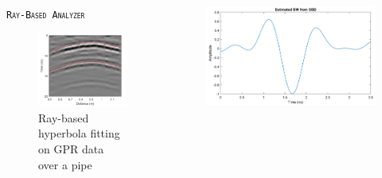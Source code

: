 \documentclass[final]{beamer}
\newlength{\onecolwid}
\newlength{\twocolwid}
\begin{document}
\begin{frame}[t]
\begin{columns}[t]
\begin{column}{\twocolwid}
\begin{columns}[t,totalwidth=\twocolwid]
\begin{column}{\onecolwid}
\begin{block}{\textsc{\texttt{Ray-Based Analyzer}}}
\begin{figure}
	\includegraphics[width=0.7\linewidth]{ray-based.png}
	\caption{Ray-based hyperbola fitting on GPR data over a pipe \cite{jazayeri2017}}
\end{figure}

\end{block}


\end{column} %

\begin{column}{\onecolwid} %

\vspace{-2cm}
\begin{block}{}%
\begin{figure}
	\includegraphics[width=0.4\linewidth]{SBD_pipe_sw.png}
	

\end{figure}
\end{block}
\end{column}
\end{columns}
\end{column}
\end{columns}
\end{frame}
\end{document}
